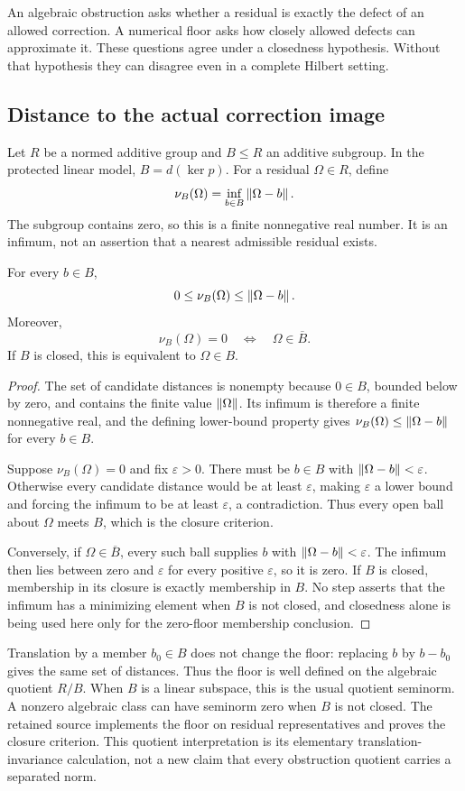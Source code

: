 \clearpage
{}\label{sec:floor}
An algebraic obstruction asks whether a residual is exactly the defect of an allowed correction. A numerical floor asks how closely allowed defects can approximate it. These questions agree under a closedness hypothesis. Without that hypothesis they can disagree even in a complete Hilbert setting.

\subsection{Distance to the actual correction image}
Let \(R\) be a normed additive group and \(B\le R\) an additive subgroup. In the protected linear model, \(B=d(\ker p)\). For a residual \(\Omega\in R\), define
\[
 \nu_B(\Omega)=\inf_{b\in B}\left\lVert\Omega-b\right\rVert.
\]
The subgroup contains zero, so this is a finite nonnegative real number. It is an infimum, not an assertion that a nearest admissible residual exists.

\begin{proposition}\label{KS76}
For every \(b\in B\),
\[
 0\le\nu_B(\Omega)\le\left\lVert\Omega-b\right\rVert.
\]
Moreover,
\[
 \nu_B(\Omega)=0\quad\Longleftrightarrow\quad\Omega\in\overline B.
\]
If \(B\) is closed, this is equivalent to \(\Omega\in B\).
\end{proposition}
\begin{proof}
The set of candidate distances is nonempty because \(0\in B\), bounded below by zero, and contains the finite value \(\left\lVert\Omega\right\rVert\). Its infimum is therefore a finite nonnegative real, and the defining lower-bound property gives \(\nu_B(\Omega)\le\left\lVert\Omega-b\right\rVert\) for every \(b\in B\).

Suppose \(\nu_B(\Omega)=0\) and fix \(\varepsilon>0\). There must be \(b\in B\) with \(\left\lVert\Omega-b\right\rVert<\varepsilon\). Otherwise every candidate distance would be at least \(\varepsilon\), making \(\varepsilon\) a lower bound and forcing the infimum to be at least \(\varepsilon\), a contradiction. Thus every open ball about \(\Omega\) meets \(B\), which is the closure criterion.

Conversely, if \(\Omega\in\overline B\), every such ball supplies \(b\) with \(\left\lVert\Omega-b\right\rVert<\varepsilon\). The infimum then lies between zero and \(\varepsilon\) for every positive \(\varepsilon\), so it is zero. If \(B\) is closed, membership in its closure is exactly membership in \(B\). No step asserts that the infimum has a minimizing element when \(B\) is not closed, and closedness alone is being used here only for the zero-floor membership conclusion.
\end{proof}
Translation by a member \(b_0\in B\) does not change the floor: replacing \(b\) by \(b-b_0\) gives the same set of distances. Thus the floor is well defined on the algebraic quotient \(R/B\). When \(B\) is a linear subspace, this is the usual quotient seminorm. A nonzero algebraic class can have seminorm zero when \(B\) is not closed. The retained source implements the floor on residual representatives and proves the closure criterion. This quotient interpretation is its elementary translation-invariance calculation, not a new claim that every obstruction quotient carries a separated norm.

